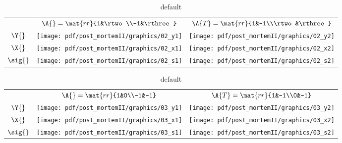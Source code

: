 \begin{table}[htdp]
\begin{center}
\begin{tabular}{ccc}
 & $\A{}  = \mat{rr}{1&\rtwo\\-1&\rthree}$ 
 & $\A{T} = \mat{rr}{1&-1\\\rtwo&\rthree} $ \\[35pt]
 $\Y{}$   & \qquad \texttt{[image: pdf/post\_mortemII/graphics/02\_y1]} 
          & \qquad \texttt{[image: pdf/post\_mortemII/graphics/02\_y2]} \\[15pt]
 $\X{}$   & \qquad \texttt{[image: pdf/post\_mortemII/graphics/02\_x1]}
          & \qquad \texttt{[image: pdf/post\_mortemII/graphics/02\_x2]} \\[20pt]
 $\sig{}$ &        \texttt{[image: pdf/post\_mortemII/graphics/02\_s1]}
          &        \texttt{[image: pdf/post\_mortemII/graphics/02\_s2]} \\[20pt]
\end{tabular}
\end{center}
\label{tab:pmII:visualsb}
\caption{default}
\end{table}%
\clearpage

\begin{table}[htdp]
\begin{center}
\begin{tabular}{ccc}
 & $\A{}  = \mat{rr}{1&0\\-1&-1}$ 
 & $\A{T} = \mat{rr}{1&-1\\0&-1}$ \\[35pt]
 $\Y{}$   & \qquad \texttt{[image: pdf/post\_mortemII/graphics/03\_y1]} 
          & \qquad \texttt{[image: pdf/post\_mortemII/graphics/03\_y2]} \\[15pt]
 $\X{}$   & \qquad \texttt{[image: pdf/post\_mortemII/graphics/03\_x1]}
          & \qquad \texttt{[image: pdf/post\_mortemII/graphics/03\_x2]} \\[20pt]
 $\sig{}$ &        \texttt{[image: pdf/post\_mortemII/graphics/03\_s1]}
          &        \texttt{[image: pdf/post\_mortemII/graphics/03\_s2]} \\[20pt]
\end{tabular}
\end{center}
\label{tab:pmII:visualsc}
\caption{default}
\end{table}%
\clearpage

